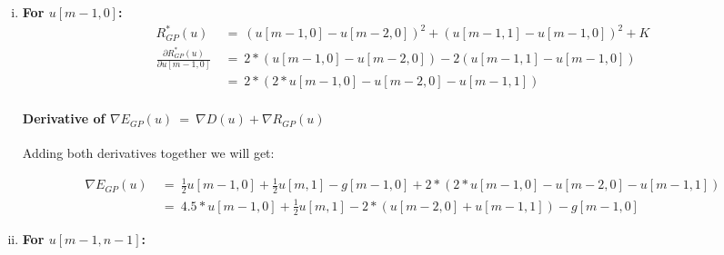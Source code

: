 \documentclass{report}
\begin{document}
\begin{enumerate}[(i)]
\begin{align*}
						\end{align*}
						\vspace{-1cm} \paragraph{Derivative of $\nabla E_{GP}(u) \ = \ \nabla D(u) + \nabla R_{GP}(u)$}
						\startsubsection
							Adding both derivatives together we will get:
						\closesection
						\begin{adjustwidth}{-6em}{}
							\vspace{-0.6cm}
							\begin{align*}
								\nabla E_{GP}(u) \ & = \ \frac{1}{2} u[0,n-1]  + \frac{1}{2} u[1,n] - g[0,n-1] + 2 * (2 * u[0,n-1] - u[1,n-1] - u[0,n-2]) \\
								& = \ 4.5 * u[0,n-1] + \frac{1}{2} u[1,n] - 2*(u[1,n-1] + u[0,n-2]) - g[0,n-1]
							\end{align*}
						\end{adjustwidth}
						\item \textbf{For $u[m-1,0]$:}
						\begin{align*}
							R_{GP}^*(u) \ & = \ (u[m-1,0] - u[m-2,0])^2 + (u[m-1,1] - u[m-1,0])^2 + K \\
							\frac{\partial R_{GP}^*(u)}{\partial u[m-1,0]} \ & = \ 2 * (u[m-1,0] - u[m-2,0]) - 2 (u[m-1,1] - u[m-1,0]) \\
							& = \ 2 * (2 * u[m-1,0] - u[m-2,0] - u[m-1,1])
						\end{align*}
						\vspace{-1cm} \paragraph{Derivative of $\nabla E_{GP}(u) \ = \ \nabla D(u) + \nabla R_{GP}(u)$}
						\startsubsection
							Adding both derivatives together we will get:
						\closesection
						\begin{adjustwidth}{-6em}{}
							\vspace{-0.6cm}
							\begin{align*}
								\nabla E_{GP}(u) \ & = \ \frac{1}{2} u[m-1,0]  + \frac{1}{2} u[m,1] - g[m-1,0] + 2 * (2 * u[m-1,0] - u[m-2,0] - u[m-1,1]) \\
								& = \ 4.5 * u[m-1,0] + \frac{1}{2} u[m,1] - 2*(u[m-2,0] + u[m-1,1]) - g[m-1,0]
							\end{align*}
						\end{adjustwidth}
						\item \textbf{For $u[m-1,n-1]$:}

\end{enumerate}
\end{document}
